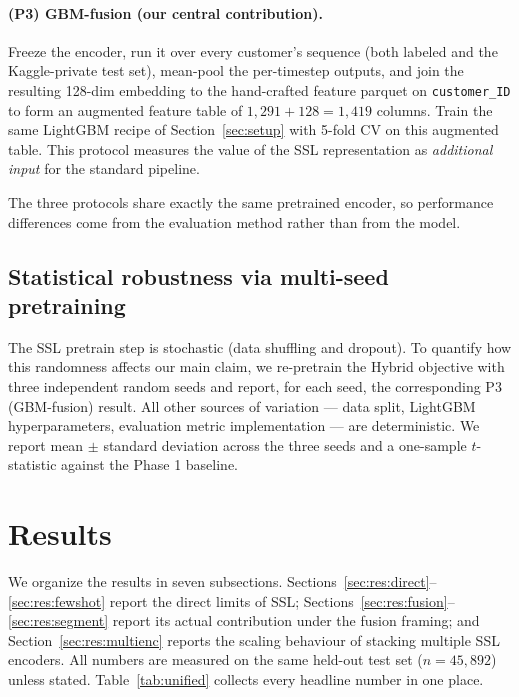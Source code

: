 \documentclass[sigconf, anonymous, review]{acmart}
\begin{document}
\paragraph{(P3) GBM-fusion (our central contribution).}
Freeze the encoder, run it over every customer's sequence (both
labeled and the Kaggle-private test set), mean-pool the per-timestep
outputs, and join the resulting 128-dim embedding to the hand-crafted
feature parquet on \texttt{customer\_ID} to form an augmented feature
table of $1{,}291 + 128 = 1{,}419$ columns. Train the same LightGBM
recipe of Section~\ref{sec:setup} with 5-fold CV on this augmented
table. This protocol measures the value of the SSL representation as
\emph{additional input} for the standard pipeline.

The three protocols share exactly the same pretrained encoder, so
performance differences come from the evaluation method rather than
from the model.

\subsection{Statistical robustness via multi-seed pretraining}
\label{sec:multiseed}

The SSL pretrain step is stochastic (data shuffling and dropout). To
quantify how this randomness affects our main claim, we re-pretrain
the Hybrid objective with three independent random seeds and report,
for each seed, the corresponding P3 (GBM-fusion) result. All other
sources of variation --- data split, LightGBM hyperparameters,
evaluation metric implementation --- are deterministic. We report
mean $\pm$ standard deviation across the three seeds and a one-sample
$t$-statistic against the Phase 1 baseline.

\section{Results}
\label{sec:results}

We organize the results in seven subsections. Sections~\ref{sec:res:direct}--\ref{sec:res:fewshot}
report the direct limits of SSL; Sections~\ref{sec:res:fusion}--\ref{sec:res:segment}
report its actual contribution under the fusion framing; and
Section~\ref{sec:res:multienc} reports the scaling behaviour of
stacking multiple SSL encoders. All
numbers are measured on the same held-out test set ($n = 45{,}892$)
unless stated. Table~\ref{tab:unified} collects every headline number
in one place.
\end{document}
